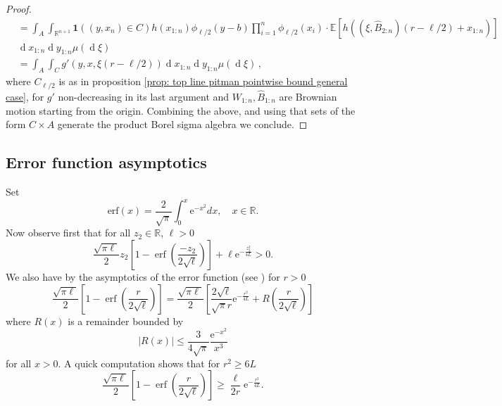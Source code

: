 \documentclass[11pt, reqno]{amsart}
\numberwithin{equation}{section}
\newcommand{\R}{\ensuremath{\mathbb{R}}}
\newcommand{\diff}{\ensuremath{\operatorname{d}\!}}
\begin{document}
\begin{proof}
\begin{equation*}
\begin{array}{cc}
         & = \displaystyle\int_{A}\int_{\R^{n+1}}\mathbf{1}((y, x_n)\in C)h(x_{1:n})\phi_{\ell/2}(y-b)\displaystyle\prod_{i=1}^n\phi_{\ell/2}(x_i)\cdot\mathbb{E}\left[h((\xi,\hat{B}_{2:n})(r-\ell/2)+x_{1:n})\right]\\
         & \diff x_{1:n}\diff y_{1:n}\mu(\diff\xi)\\
         & = \displaystyle\int_{A}\int_{C}g'(y,x,\xi(r-\ell/2))\diff x_{1:n}\diff y_{1:n}\mu(\diff\xi)\,,
    \end{array}
\end{equation*}
where $C_{\ell/2}$ is as in proposition \ref{prop: top line pitman pointwise bound general case}, for $g'$ non-decreasing in its last argument and $W_{1:n}, \hat{B}_{1:n}$ are Brownian motion starting from the origin. Combining the above, and using that sets of the form $C\times A$ generate the product Borel sigma algebra we conclude.
\end{proof}

\subsection{Error function asymptotics}\label{app: erf asymptotics}
Set  
\begin{equation*}
    \mathrm{erf}(x) = \frac{2}{\sqrt{\pi}}\displaystyle\int_{0}^x\mathrm{e}^{-x^2}dx, \quad x\in \R.
\end{equation*}
Now observe first that for all $z_2\in \R$, $\ell > 0$
\begin{equation*}
    \frac{\sqrt{\pi \ell}}{2} z_2  \left[1-\operatorname{erf}\left(\frac{ -z_2}{2 \sqrt{\ell}}\right)\right]+ \ell\mathrm{e}^{- \frac{z_2^{2}}{4L} } > 0.
\end{equation*}
We also have by the asymptotics of the error function (see \cite{abramowitz1948handbook}) for $r>0$
\begin{equation*}\label{eq: asymptotics erf}
    \frac{\sqrt{\pi \ell}}{2}  \left[1-\operatorname{erf}\left(\frac{ r}{2 \sqrt{\ell}}\right)\right] =  \frac{\sqrt{\pi \ell}}{2} \left[\frac{2\sqrt{\ell}}{\sqrt{\pi}r}\mathrm{e}^{-\frac{r^2}{4L}} + R\left(\frac{r}{2\sqrt{\ell}}\right) \right]
\end{equation*}
where $R(x)$ is a remainder bounded by
\begin{equation*}
    |R(x)|\le \frac{3}{4\sqrt{\pi}}\frac{\mathrm{e}^{-x^2}}{x^3}
\end{equation*}
for all $x>0$. A quick computation shows that for $r^2\ge 6L$
\begin{equation*}
    \frac{\sqrt{\pi \ell}}{2}  \left[1-\operatorname{erf}\left(\frac{ r}{2 \sqrt{\ell}}\right)\right] \ge  \frac{\ell}{2r}\mathrm{e}^{-\frac{r^2}{4L}}.
\end{equation*}
\end{document}
